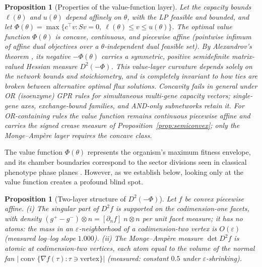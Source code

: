 \documentclass[11pt,a4paper]{article}
\theoremstyle{plain}
\newtheorem{proposition}[theorem]{Proposition}
\theoremstyle{definition}
\theoremstyle{remark}
\begin{document}
\begin{proposition}[Properties of the value-function layer]\label{prop:alex}
Let the capacity bounds $\ell(\theta)$ and $u(\theta)$ depend
affinely on $\theta$, with the LP feasible and bounded, and let
$\Phi(\theta) = \max\{ c^\top v : Sv = 0,\ \ell(\theta) \le v \le
u(\theta)\}$. The optimal value function $\Phi(\theta)$ is concave,
continuous, and piecewise affine (pointwise infimum of affine dual
objectives over a $\theta$-independent dual feasible set). By
Alexandrov's theorem \citep{alexandrov1939}, its negative
$-\Phi(\theta)$ carries a symmetric, positive semidefinite
matrix-valued Hessian measure $D^2(-\Phi)$. This value-layer
curvature depends solely on the network bounds and stoichiometry, and
is completely invariant to how ties are broken between alternative
optimal flux solutions. Concavity fails in general under OR
(isoenzyme) GPR rules for simultaneous multi-gene capacity vectors;
single-gene axes, exchange-bound families, and AND-only subnetworks
retain it. For OR-containing rules the value function remains
continuous piecewise affine and carries the signed crease measure of
Proposition~\ref{prop:semiconvex}; only the Monge--Amp\`ere layer
requires the concave class.
\end{proposition}

The value function $\Phi(\theta)$ represents the organism's maximum
fitness envelope, and its chamber boundaries correspond to the sector
divisions seen in classical phenotype phase planes \citep{edwards2001,
ibarra2002}. However, as we establish below, looking only at the
value function creates a profound blind spot.

\begin{proposition}[Two-layer structure of $D^2(-\Phi)$]\label{prop:twolayer}
Let $f$ be convex piecewise affine. (i) The singular part of $D^2 f$ is
supported on the codimension-one facets, with density
$(g^{+} - g^{-}) \otimes n = [\partial_{n} f]\; n \otimes n$ per unit facet measure; it has no
atoms: the mass in an $\varepsilon$-neighborhood of a codimension-two
vertex is $O(\varepsilon)$ (measured log--log slope $1.000$). (ii) The
Monge--Amp\`ere measure $\det D^2 f$ is atomic at codimension-two
vertices, each atom equal to the volume of the normal fan
$|\operatorname{conv}\{\nabla f(\tau) : \tau \ni \text{vertex}\}|$
(measured: constant $0.5$ under $\varepsilon$-shrinking).
\end{proposition}
\end{document}
